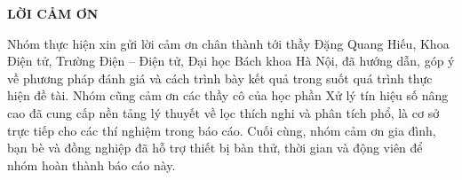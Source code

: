 \documentclass[../main.tex]{subfiles}
\begin{document}
\begin{center}
    \Large{\textbf{LỜI CẢM ƠN}}
\end{center}
\vspace{0.5cm}

Nhóm thực hiện xin gửi lời cảm ơn chân thành tới thầy Đặng Quang Hiếu, Khoa Điện tử, Trường Điện -- Điện tử, Đại học Bách khoa Hà Nội, đã hướng dẫn, góp ý về phương pháp đánh giá và cách trình bày kết quả trong suốt quá trình thực hiện đề tài. Nhóm cũng cảm ơn các thầy cô của học phần Xử lý tín hiệu số nâng cao đã cung cấp nền tảng lý thuyết về lọc thích nghi và phân tích phổ, là cơ sở trực tiếp cho các thí nghiệm trong báo cáo. Cuối cùng, nhóm cảm ơn gia đình, bạn bè và đồng nghiệp đã hỗ trợ thiết bị bàn thử, thời gian và động viên để nhóm hoàn thành báo cáo này.
\end{document}
